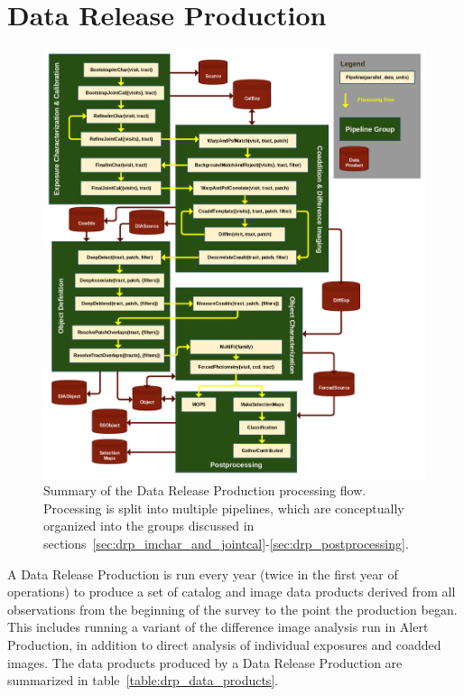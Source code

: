 \section{Data Release Production}
\label{sec:drp}

\begin{figure}
\centering
\includegraphics[width=\textwidth]{figures/drp_summary.png}
\caption{Summary of the Data Release Production processing flow.  Processing is split into multiple pipelines, which are conceptually organized into the groups discussed in sections~\ref{sec:drp_imchar_and_jointcal}-\ref{sec:drp_postprocessing}.
\label{fig:drp_summary}}
\end{figure}

A Data Release Production is run every year (twice in the first year of operations) to produce a set of catalog and image data products derived from all observations from the beginning of the survey to the point the production began.  This includes running a variant of the difference image analysis run in Alert Production, in addition to direct analysis of individual exposures and coadded images.  The data products produced by a Data Release Production are summarized in table~\ref{table:drp_data_products}.


